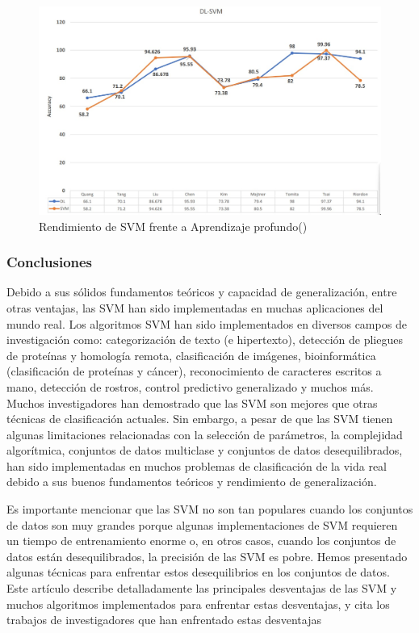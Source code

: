 \begin{figure}[H]
\begin{center}
	\includegraphics[width=1\textwidth]{2/figures/svm6.jpeg}
	\caption{Rendimiento de SVM frente a Aprendizaje profundo(\cite{tecnica3})}
\end{center}
\end{figure}

\subsubsection{Conclusiones}
Debido a sus sólidos fundamentos teóricos y capacidad de generalización, entre otras ventajas, las SVM han sido implementadas en muchas aplicaciones del mundo real. Los algoritmos SVM han sido implementados en diversos campos de investigación como: categorización de texto (e hipertexto), detección de pliegues de proteínas y homología remota, clasificación de imágenes, bioinformática (clasificación de proteínas y cáncer), reconocimiento de caracteres escritos a mano, detección de rostros, control predictivo generalizado y muchos más. Muchos investigadores han demostrado que las SVM son mejores que otras técnicas de clasificación actuales. Sin embargo, a pesar de que las SVM tienen algunas limitaciones relacionadas con la selección de parámetros, la complejidad algorítmica, conjuntos de datos multiclase y conjuntos de datos desequilibrados, han sido implementadas en muchos problemas de clasificación de la vida real debido a sus buenos fundamentos teóricos y rendimiento de generalización.

Es importante mencionar que las SVM no son tan populares cuando los conjuntos de datos son muy grandes porque algunas implementaciones de SVM requieren un tiempo de entrenamiento enorme o, en otros casos, cuando los conjuntos de datos están desequilibrados, la precisión de las SVM es pobre. Hemos presentado algunas técnicas para enfrentar estos desequilibrios en los conjuntos de datos. Este artículo describe detalladamente las principales desventajas de las SVM y muchos algoritmos implementados para enfrentar estas desventajas, y cita los trabajos de investigadores que han enfrentado estas desventajas
